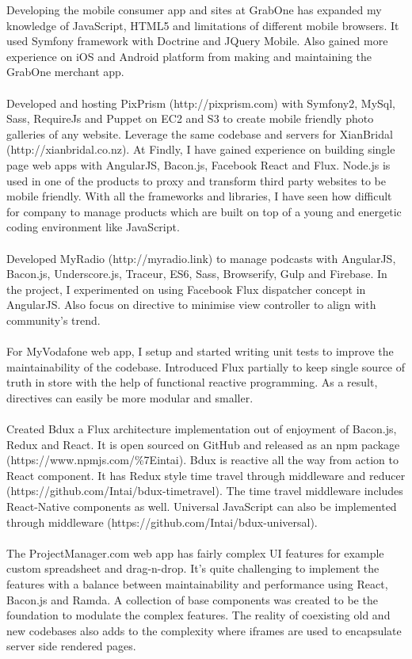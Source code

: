 \begin{resume}
Developing the mobile consumer app and sites at GrabOne has expanded my knowledge of JavaScript, HTML5 and limitations of different mobile browsers. It used Symfony framework with Doctrine and JQuery Mobile. Also gained more experience on iOS and Android platform from making and maintaining the GrabOne merchant app.
\\\\
Developed and hosting PixPrism (http://pixprism.com) with Symfony2, MySql, Sass, RequireJs and Puppet on EC2 and S3 to create mobile friendly photo galleries of any website. Leverage the same codebase and servers for XianBridal (http://xianbridal.co.nz).
\newpage
At Findly, I have gained experience on building single page web apps with AngularJS, Bacon.js, Facebook React and Flux. Node.js is used in one of the products to proxy and transform third party websites to be mobile friendly. With all the frameworks and libraries, I have seen how difficult for company to manage products which are built on top of a young and energetic coding environment like JavaScript.
\\\\
Developed MyRadio (http://myradio.link) to manage podcasts with AngularJS, Bacon.js, Underscore.js, Traceur, ES6, Sass, Browserify, Gulp and Firebase. In the project, I experimented on using Facebook Flux dispatcher concept in AngularJS. Also focus on directive to minimise view controller to align with community's trend.
\\\\
For MyVodafone web app, I setup and started writing unit tests to improve the maintainability of the codebase. Introduced Flux partially to keep single source of truth in store with the help of functional reactive programming. As a result, directives can easily be more modular and smaller.
\\\\
Created Bdux a Flux architecture implementation out of enjoyment of Bacon.js, Redux and React. It is open sourced on GitHub and released as an npm package (https://www.npmjs.com/\%7Eintai). Bdux is reactive all the way from action to React component. It has Redux style time travel through middleware and reducer (https://github.com/Intai/bdux-timetravel). The time travel middleware includes React-Native components as well. Universal JavaScript can also be implemented through middleware (https://github.com/Intai/bdux-universal).
\\\\
The ProjectManager.com web app has fairly complex UI features for example custom spreadsheet and drag-n-drop. It's quite challenging to implement the features with a balance between maintainability and performance using React, Bacon.js and Ramda. A collection of base components was created to be the foundation to modulate the complex features. The reality of coexisting old and new codebases also adds to the complexity where iframes are used to encapsulate server side rendered pages.


\end{resume}
